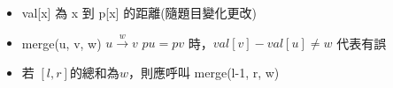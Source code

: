 \begin{itemize}
    \item val[x] 為 x 到 p[x] 的距離(隨題目變化更改)
    \item merge(u, v, w)
        \subitem $u \stackrel{w}{\longrightarrow} v$
        \subitem $pu=pv$ 時，$val[v]-val[u] \ne w$ 代表有誤
    \item 若 $[l, r]$的總和為$w$，則應呼叫 merge(l-1, r, w)
\end{itemize}